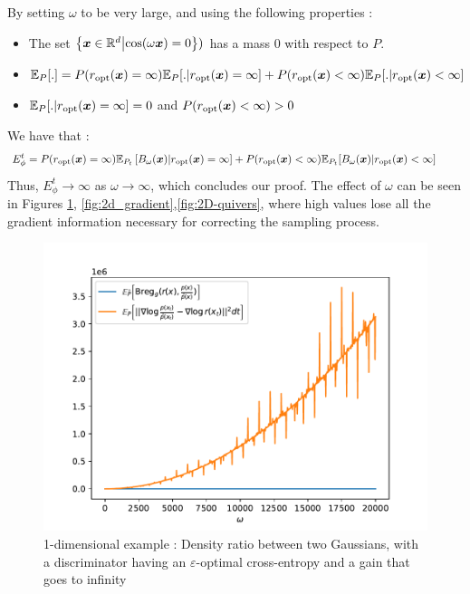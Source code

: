 By setting $\omega$ to be very large, and using the following properties : 
\begin{itemize}
    \item The set $\left\{ \boldsymbol{x} \in\mathbb{R}^d \middle\vert\cos(\omega \boldsymbol{x}) = 0\right\})$ has a mass $0$ with respect to $P$.
  \item $\mathbb{E}_{P}[.] = P(r_{{\mathrm{opt}}}(\boldsymbol{x}) = \infty)\mathbb{E}_{P}[. | r_{{\mathrm{opt}}}(\boldsymbol{x}) = \infty] + P(r_{{\mathrm{opt}}}(\boldsymbol{x}) < \infty) \mathbb{E}_{P}[. | r_{{\mathrm{opt}}}(\boldsymbol{x}) < \infty]$
  \item $\mathbb{E}_{P}[. | r_{{\mathrm{opt}}}(\boldsymbol{x}) = \infty] = 0$ and $P(r_{{\mathrm{opt}}}(\boldsymbol{x}) < \infty) > 0$
\end{itemize}
We have that : 
\begin{align}
    E_{\phi}^{t} &= 
    \begin{aligned}
    &P(r_{{\mathrm{opt}}}(\boldsymbol{x}) = \infty) \mathbb{E}_{P_{t}}\left[B_{\omega}(\boldsymbol{x})
    \middle\vert r_{{\mathrm{opt}}}(\boldsymbol{x}) = \infty\right] + P(r_{{\mathrm{opt}}}(\boldsymbol{x}) < \infty) \mathbb{E}_{P_{t}}[B_{\omega}(\boldsymbol{x}) | r_{{\mathrm{opt}}}(\boldsymbol{x}) < \infty]
    \end{aligned}
\end{align}
Thus, $E_{\phi}^{t} \to \infty$ as $\omega \to \infty$, which concludes our proof.
The effect of $\omega$ can be seen in Figures \ref{fig:1Dexple}, \ref{fig:2d_gradient},\ref{fig:2D-quivers}, where high values lose all the gradient information necessary for correcting the sampling process. 
\begin{figure}[h]
    \centering
    \includegraphics[width=0.8\linewidth]{gfx/1D_exple.pdf}
    \caption{1-dimensional example : Density ratio between two Gaussians, with a discriminator having an $\varepsilon$-optimal cross-entropy and a gain that goes to infinity}
    \label{fig:1Dexple}
\end{figure}







